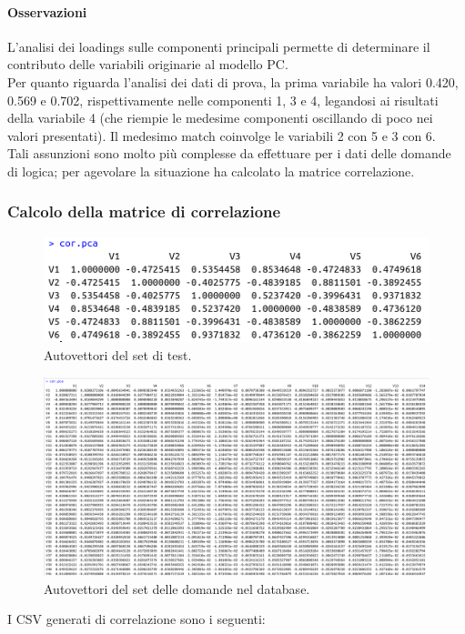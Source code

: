 \paragraph{Osservazioni}
L'analisi dei loadings sulle componenti principali permette di determinare il contributo delle variabili originarie al modello PC.\\
Per quanto riguarda l'analisi dei dati di prova,  la prima variabile ha valori  0.420, 0.569 e 0.702,  rispettivamente nelle componenti 1, 3 e 4, legandosi ai risultati della variabile 4 (che riempie le medesime componenti oscillando di poco nei valori presentati). Il medesimo match coinvolge le variabili 2 con 5 e 3 con 6.\\
Tali assunzioni sono molto pi\`u complesse da effettuare per  i  dati delle domande di logica; per agevolare la situazione ha calcolato la matrice correlazione.

\subsubsection{Calcolo della matrice di correlazione}
\label{Calcolo della matrice di correlazione}

\begin{figure}[H]
\centering
	\includegraphics[width=0.60\linewidth]{../../PCA/plot/correlazione_rete-prova.png}
	\caption{Autovettori del set di test.}
	\label{Autovettori del set di test.}
\end{figure}

\begin{figure}[H]
\centering
	\includegraphics[width=1\linewidth]{../../PCA/plot/correlazione_rete-db.png}
	\caption{Autovettori del set delle domande nel database.}
	\label{Autovettori del set delle domande di logica.}
\end{figure}
\noindent
I CSV generati di correlazione sono i seguenti:

